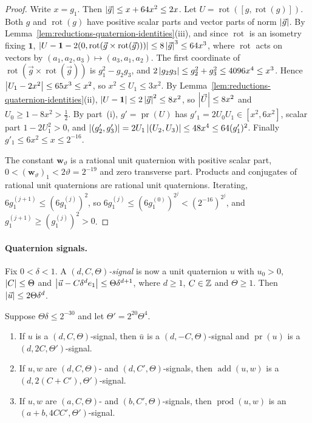 \begin{proof}
Write $x=g_1$. Then $\left\lvert\vec g\right\rvert\le x+64x^2\le2x$. Let $U=\operatorname{rot}([g,\operatorname{rot}(g)])$. Both
$g$ and $\operatorname{rot}(g)$ have positive scalar parts and vector parts of norm
$\left\lvert\vec g\right\rvert$. By Lemma~\ref{lem:reductions-quaternion-identities}(iii), and
since $\operatorname{rot}$ is an isometry fixing $\mathbf1$,
$\left\lvert U-\mathbf1-2(0,\operatorname{rot}(\vec g\times\operatorname{rot}(\vec g)))\right\rvert\le8\left\lvert\vec g\right\rvert^3\le64x^3$, where
$\operatorname{rot}$ acts on vectors by $(a_1,a_2,a_3)\mapsto(a_3,a_1,a_2)$. The first coordinate
of $\operatorname{rot}(\vec g\times\operatorname{rot}(\vec g))$ is $g_1^2-g_2g_3$, and
$2\left\lvert g_2g_3\right\rvert\le g_2^2+g_3^2\le4096x^4\le x^3$. Hence
$\left\lvert U_1-2x^2\right\rvert\le65x^3\le x^2$, so $x^2\le U_1\le3x^2$. By
Lemma~\ref{lem:reductions-quaternion-identities}(ii),
$\left\lvert U-\mathbf1\right\rvert\le2\left\lvert\vec g\right\rvert^2\le8x^2$, so $\left\lvert\vec U\right\rvert\le8x^2$ and
$U_0\ge1-8x^2>\frac12$. By part~(i), $g'=\operatorname{pr}(U)$ has
$g'_1=2U_0U_1\in[x^2,6x^2]$, scalar part $1-2U_1^2>0$, and
$\left\lvert(g'_2,g'_3)\right\rvert=2U_1\left\lvert(U_2,U_3)\right\rvert\le48x^4\le64(g_1')^2$. Finally
$g'_1\le6x^2\le x\le2^{-16}$.

The constant $\mathbf w_\vartheta$ is a rational unit quaternion with positive
scalar part, $0<(\mathbf w_\vartheta)_1<2\vartheta=2^{-19}$ and zero transverse
part. Products and conjugates of rational unit quaternions are rational unit
quaternions. Iterating, $6g^{(j+1)}_1\le(6g^{(j)}_1)^2$, so
$6g^{(j)}_1\le(6g^{(0)}_1)^{2^j}<(2^{-16})^{2^j}$, and $g^{(j+1)}_1\ge(g^{(j)}_1)^2>0$.
\end{proof}

\paragraph{Quaternion signals.}
Fix $0<\delta<1$. A \emph{$(d,C,\Theta)$-signal} is now a unit quaternion $u$
with $u_0>0$, $\left\lvert C\right\rvert\le\Theta$ and $\left\lvert\vec u-C\delta^de_1\right\rvert\le\Theta\delta^{d+1}$,
where $d\ge1$, $C\in\mathbb Z$ and $\Theta\ge1$. Then $\left\lvert\vec u\right\rvert\le2\Theta\delta^d$.

\begin{lemma}
\label{lem:reductions-quaternion-signals}
Suppose $\Theta\delta\le2^{-30}$ and let $\Theta'=2^{20}\Theta^4$.
\begin{enumerate}[label=(\roman*)]
\item If $u$ is a $(d,C,\Theta)$-signal, then $\bar u$ is a $(d,-C,\Theta)$-signal
and $\operatorname{pr}(u)$ is a $(d,2C,\Theta')$-signal.
\item If $u,w$ are $(d,C,\Theta)$- and $(d,C',\Theta)$-signals, then $\operatorname{add}(u,w)$ is a
$(d,2(C+C'),\Theta')$-signal.
\item If $u,w$ are $(a,C,\Theta)$- and $(b,C',\Theta)$-signals, then $\operatorname{prod}(u,w)$ is an
$(a+b,4CC',\Theta')$-signal.
\end{enumerate}
\end{lemma}

